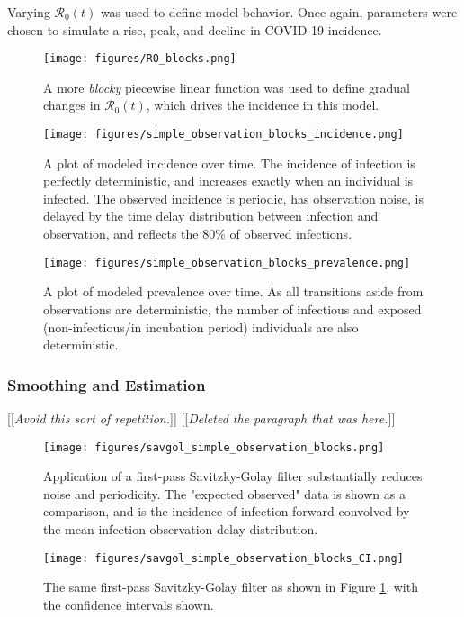 \documentclass{article}
\newcommand{\nR}{\mathcal{R}}
\newcommand{\jd}[1]{[[\textsl{#1}]]} %
\newcommand{\msComment}[1]{[[\textsl{#1}]]}
\begin{document}
Varying $\nR_0(t)$ was used to define model behavior. Once again, parameters were chosen to simulate a rise, peak, and decline in COVID-19 incidence.

\begin{figure}[h!]
\centering
\texttt{[image: figures/R0\_blocks.png]}
\caption{A more \emph{blocky} piecewise linear function was used to define gradual changes in $\nR_0(t)$, which drives the incidence in this model.}

\end{figure}

\clearpage
\begin{figure}[h!]
\centering
\texttt{[image: figures/simple\_observation\_blocks\_incidence.png]}
\caption{A plot of modeled incidence over time. The incidence of infection is perfectly deterministic, and increases exactly when an individual is infected. The observed incidence is periodic, has observation noise, is delayed by the time delay distribution between infection and observation, and reflects the 80\% of observed infections.}
\end{figure}

\begin{figure}[h!]
\centering
\texttt{[image: figures/simple\_observation\_blocks\_prevalence.png]}
\caption{A plot of modeled prevalence over time. As all transitions aside from observations are deterministic, the number of infectious and exposed (non-infectious/in incubation period) individuals are also deterministic.}
\end{figure}

\subsubsection{Smoothing and Estimation}

\jd{Avoid this sort of repetition.} \msComment{Deleted the paragraph that was here.}

\begin{figure}[h!]
\centering
\texttt{[image: figures/savgol\_simple\_observation\_blocks.png]}
\caption{Application of a first-pass Savitzky-Golay filter substantially reduces noise and periodicity. The "expected observed" data is shown as a comparison, and is the incidence of infection forward-convolved by the mean infection-observation delay distribution.}
\label{SGnoCIBlocks}
\end{figure}

\begin{figure}[h!]
\centering
\texttt{[image: figures/savgol\_simple\_observation\_blocks\_CI.png]}
\caption{The same first-pass Savitzky-Golay filter as shown in Figure \ref{SGnoCIBlocks}, with the confidence intervals shown.} 

\end{figure}
\end{document}
